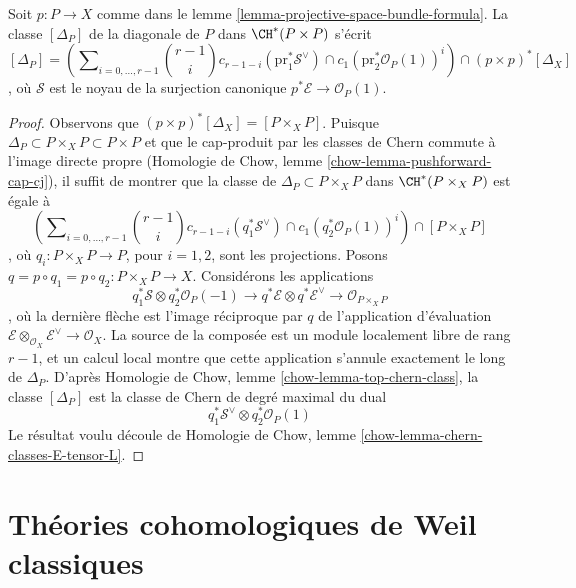 \begin{lemma}
\label{lemma-diagonal-projective-bundle}
Soit $p : P \to X$ comme dans le lemme \ref{lemma-projective-space-bundle-formula}.
La classe $[\Delta_P]$ de la diagonale de $P$ dans $\CH^*(P \times P)$
s'écrit
$$
[\Delta_P] =
\left(\sum\nolimits_{i = 0, \ldots, r - 1}
{r - 1 \choose i} c_{r - 1 - i}(\text{pr}_1^*\mathcal{S}^\vee) \cap
c_1(\text{pr}_2^*\mathcal{O}_P(1))^i\right)
\cap
(p \times p)^*[\Delta_X]
$$,
où $\mathcal{S}$ est le noyau de la surjection canonique
$p^*\mathcal{E} \to \mathcal{O}_P(1)$.
\end{lemma}

\begin{proof}
Observons que $(p \times p)^*[\Delta_X] = [P \times_X P]$.
Puisque $\Delta_P \subset P \times_X P \subset P \times P$
et que le cap-produit par les classes de Chern commute à l'image directe propre
(Homologie de Chow, lemme \ref{chow-lemma-pushforward-cap-cj}),
il suffit de montrer que la classe de
$\Delta_P \subset P \times_X P$ dans $\CH^*(P \times_X P)$
est égale à
$$
\left(\sum\nolimits_{i = 0, \ldots, r - 1}
{r - 1 \choose i} c_{r - 1 - i}(q_1^*\mathcal{S}^\vee) \cap
c_1(q_2^*\mathcal{O}_P(1))^i\right)
\cap
[P \times_X P]
$$,
où $q_i : P \times_X P \to P$, pour $i = 1, 2$, sont les projections.
Posons $q = p \circ q_1 = p \circ q_2 : P \times_X P \to X$.
Considérons les applications
$$
q_1^*\mathcal{S} \otimes q_2^*\mathcal{O}_P(-1) \to
q^*\mathcal{E} \otimes q^*\mathcal{E}^\vee \to
\mathcal{O}_{P \times_X P}
$$,
où la dernière flèche est l'image réciproque par $q$ de l'application d'évaluation
$\mathcal{E} \otimes_{\mathcal{O}_X} \mathcal{E}^\vee \to \mathcal{O}_X$.
La source de la composée est un module localement libre de rang $r - 1$,
et un calcul local montre que cette application s'annule exactement le long de
$\Delta_P$. D'après Homologie de Chow, lemme \ref{chow-lemma-top-chern-class},
la classe $[\Delta_P]$ est la classe de Chern de degré maximal du dual
$$
q_1^*\mathcal{S}^\vee \otimes q_2^*\mathcal{O}_P(1)
$$
Le résultat voulu découle de Homologie de Chow, lemme
\ref{chow-lemma-chern-classes-E-tensor-L}.
\end{proof}








\section{Théories cohomologiques de Weil classiques}
\label{section-axioms-classical}

